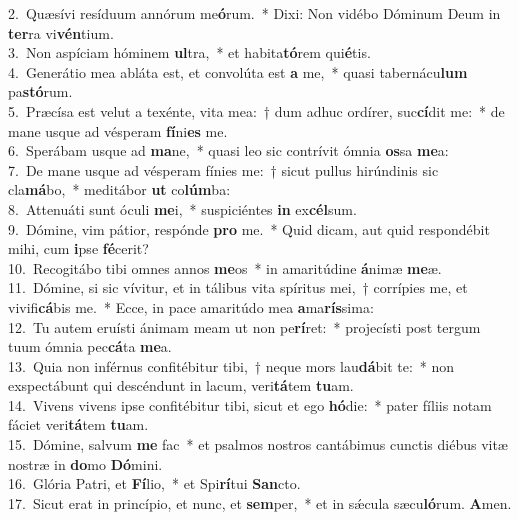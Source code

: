 {2.~}Quæsívi resíduum annórum me\textbf{ó}rum.~* Dixi: Non vidébo Dóminum Deum in \textbf{ter}ra vi\textbf{vén}tium.\\
{3.~}Non aspíciam hóminem \textbf{ul}tra,~* et habita\textbf{tó}rem qui\textbf{é}tis.\\
{4.~}Generátio mea abláta est, et convolúta est \textbf{a} me,~* quasi tabernácu\textbf{lum} pa\textbf{stó}rum.\\
{5.~}Præcísa est velut a texénte, vita mea:~† dum adhuc ordírer, suc\textbf{cí}dit me:~* de mane usque ad vésperam \textbf{fí}ni\textbf{es} me.\\
{6.~}Sperábam usque ad \textbf{ma}ne,~* quasi leo sic contrívit ómnia \textbf{os}sa \textbf{me}a:\\
{7.~}De mane usque ad vésperam fínies me:~† sicut pullus hirúndinis sic cla\textbf{má}bo,~* meditábor \textbf{ut} co\textbf{lúm}ba:\\
{8.~}Attenuáti sunt óculi \textbf{me}i,~* suspiciéntes \textbf{in} ex\textbf{cél}sum.\\
{9.~}Dómine, vim pátior, respónde \textbf{pro} me.~* Quid dicam, aut quid respondébit mihi, cum \textbf{i}pse \textbf{fé}cerit?\\
{10.~}Recogitábo tibi omnes annos \textbf{me}os~* in amaritúdine \textbf{á}nimæ \textbf{me}æ.\\
{11.~}Dómine, si sic vívitur, et in tálibus vita spíritus mei,~† corrípies me, et vivifi\textbf{cá}bis me.~* Ecce, in pace amaritúdo mea \textbf{a}ma\textbf{rís}sima:\\
{12.~}Tu autem eruísti ánimam meam ut non pe\textbf{rí}ret:~* projecísti post tergum tuum ómnia pec\textbf{cá}ta \textbf{me}a.\\
{13.~}Quia non inférnus confitébitur tibi,~† neque mors lau\textbf{dá}bit te:~* non exspectábunt qui descéndunt in lacum, veri\textbf{tá}tem \textbf{tu}am.\\
{14.~}Vivens vivens ipse confitébitur tibi, sicut et ego \textbf{hó}die:~* pater fíliis notam fáciet veri\textbf{tá}tem \textbf{tu}am.\\
{15.~}Dómine, salvum \textbf{me} fac~* et psalmos nostros cantábimus cunctis diébus vitæ nostræ in \textbf{do}mo \textbf{Dó}mini.\\
{16.~}Glória Patri, et \textbf{Fí}lio,~* et Spi\textbf{rí}tui \textbf{San}cto.\\
{17.~}Sicut erat in princípio, et nunc, et \textbf{sem}per,~* et in sǽcula sæcu\textbf{ló}rum. \textbf{A}men.\\
